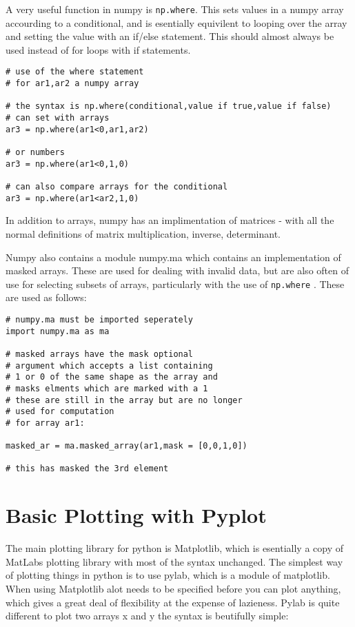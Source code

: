 \documentclass[11pt,a4paper]{article}
\begin{document}
A very useful function in numpy is \verb|np.where|. This sets values in a numpy array accourding to a conditional, and is esentially equivilent to looping over the array and setting the value with an if/else statement. This should almost always be used instead of for loops with if statements. 

\begin{verbatim}
# use of the where statement
# for ar1,ar2 a numpy array

# the syntax is np.where(conditional,value if true,value if false)
# can set with arrays
ar3 = np.where(ar1<0,ar1,ar2)

# or numbers
ar3 = np.where(ar1<0,1,0)

# can also compare arrays for the conditional
ar3 = np.where(ar1<ar2,1,0)

\end{verbatim} 

In addition to arrays, numpy has an implimentation of matrices - with all the normal definitions of matrix multiplication, inverse, determinant.

Numpy also contains a module numpy.ma which contains an implementation of masked arrays. These are used for dealing with invalid data, but are also often of use for selecting subsets of arrays, particularly with the use of \verb|np.where| . These are used as follows:

\begin{verbatim}
# numpy.ma must be imported seperately
import numpy.ma as ma

# masked arrays have the mask optional
# argument which accepts a list containing
# 1 or 0 of the same shape as the array and
# masks elments which are marked with a 1
# these are still in the array but are no longer
# used for computation 
# for array ar1:

masked_ar = ma.masked_array(ar1,mask = [0,0,1,0])

# this has masked the 3rd element

\end{verbatim}

\section{Basic Plotting with Pyplot}

The main plotting library for python is Matplotlib, which is esentially a copy of MatLabs plotting library with most of the syntax unchanged. The simplest way of plotting things in python is to use pylab, which is a module of matplotlib. When using Matplotlib alot needs to be specified before you can plot anything, which gives a great deal of flexibility at the expense of lazieness. Pylab is quite different to plot two arrays x and y the syntax is beutifully simple:
\end{document}
